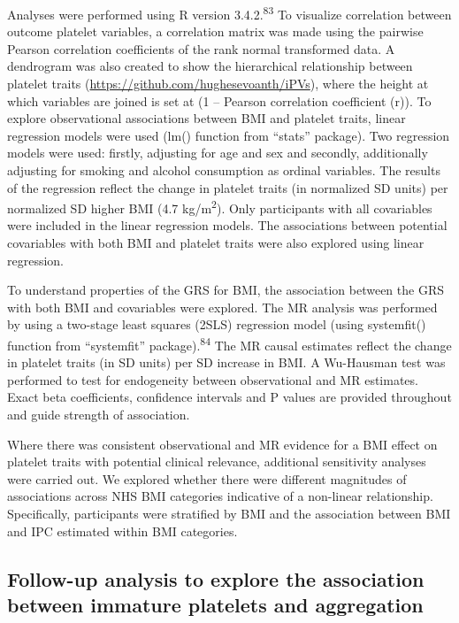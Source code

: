 \documentclass[11pt,twoside]{bristolthesis}
\begin{document}
Analyses were performed using R version 3.4.2.\textsuperscript{83} To visualize correlation between outcome platelet variables, a correlation matrix was made using the pairwise Pearson correlation coefficients of the rank normal transformed data. A dendrogram was also created to show the hierarchical relationship between platelet traits (\url{https://github.com/hughesevoanth/iPVs}), where the height at which variables are joined is set at (1 -- Pearson correlation coefficient (r)). To explore observational associations between BMI and platelet traits, linear regression models were used (lm() function from ``stats'' package). Two regression models were used: firstly, adjusting for age and sex and secondly, additionally adjusting for smoking and alcohol consumption as ordinal variables. The results of the regression reflect the change in platelet traits (in normalized SD units) per normalized SD higher BMI (4.7 kg/m\textsuperscript{2}). Only participants with all covariables were included in the linear regression models. The associations between potential covariables with both BMI and platelet traits were also explored using linear regression.

To understand properties of the GRS for BMI, the association between the GRS with both BMI and covariables were explored. The MR analysis was performed by using a two-stage least squares (2SLS) regression model (using systemfit() function from ``systemfit'' package).\textsuperscript{84} The MR causal estimates reflect the change in platelet traits (in SD units) per SD increase in BMI. A Wu-Hausman test was performed to test for endogeneity between observational and MR estimates. Exact beta coefficients, confidence intervals and P values are provided throughout and guide strength of association.

Where there was consistent observational and MR evidence for a BMI effect on platelet traits with potential clinical relevance, additional sensitivity analyses were carried out. We explored whether there were different magnitudes of associations across NHS BMI categories indicative of a non-linear relationship. Specifically, participants were stratified by BMI and the association between BMI and IPC estimated within BMI categories.

\hypertarget{follow-up-analysis-to-explore-the-association-between-immature-platelets-and-aggregation}{%
\subsection{Follow-up analysis to explore the association between immature platelets and aggregation}\label{follow-up-analysis-to-explore-the-association-between-immature-platelets-and-aggregation}}
\end{document}
